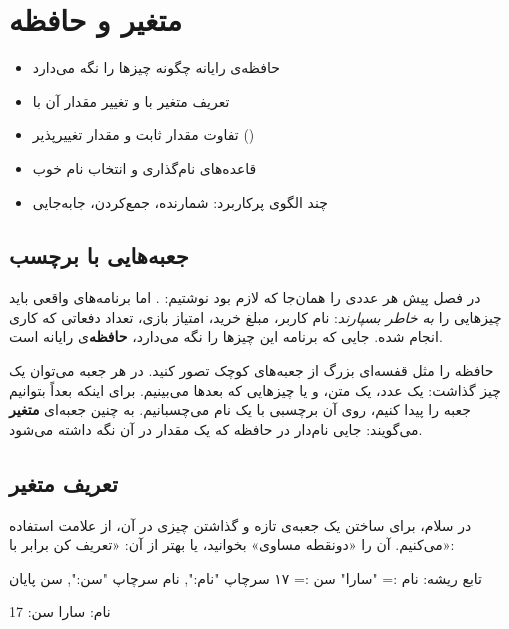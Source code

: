 \chapter{متغیر و حافظه}\label{ch:variables}

\begin{goals}
\begin{itemize}
  \item حافظه‌ی رایانه چگونه چیزها را نگه می‌دارد
  \item تعریف متغیر با \code{:=} و تغییر مقدار آن با \code{=}
  \item تفاوت مقدار ثابت و مقدار تغییرپذیر ()
  \item قاعده‌های نام‌گذاری و انتخاب نام خوب
  \item چند الگوی پرکاربرد: شمارنده، جمع‌کردن، جابه‌جایی
\end{itemize}
\end{goals}

\section{جعبه‌هایی با برچسب}

در فصل پیش هر عددی را همان‌جا که لازم بود نوشتیم: .
اما برنامه‌های واقعی باید چیزهایی را \emph{به خاطر بسپارند}: نام کاربر، مبلغ
خرید، امتیاز بازی، تعداد دفعاتی که کاری انجام شده. جایی که برنامه این
چیزها را نگه می‌دارد، \textbf{حافظه}‌ی رایانه است.

حافظه را مثل قفسه‌ای بزرگ از جعبه‌های کوچک تصور کنید. در هر جعبه می‌توان
یک چیز گذاشت: یک عدد، یک متن، و یا چیزهایی که بعدها می‌بینیم. برای اینکه
بعداً بتوانیم جعبه را پیدا کنیم، روی آن برچسبی با یک نام می‌چسبانیم. به
چنین جعبه‌ای \textbf{متغیر} می‌گویند: جایی نام‌دار در حافظه که یک مقدار در
آن نگه داشته می‌شود.

\section{تعریف متغیر}

در سلام، برای ساختن یک جعبه‌ی تازه و گذاشتن چیزی در آن، از علامت \code{:=}
استفاده می‌کنیم. آن را «دونقطه مساوی» بخوانید، یا بهتر از آن: «تعریف کن
برابر با»:

\begin{salamfa}
تابع ریشه:
    نام := "سارا"
    سن := ۱۷
    سرچاپ "نام:", نام
    سرچاپ "سن:", سن
پایان
\end{salamfa}

\begin{outputfa}
نام: سارا
سن: 17
\end{outputfa}

